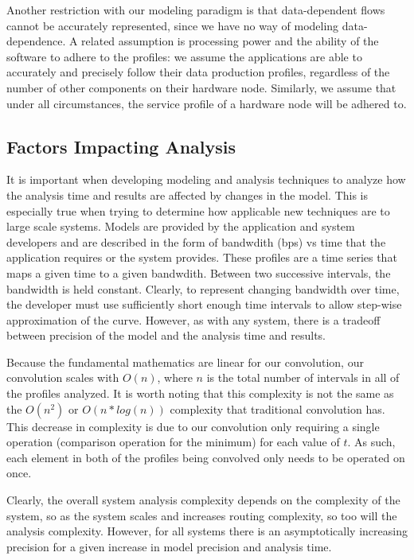Another restriction with our modeling paradigm is that data-dependent
flows cannot be accurately represented, since we have no way of
modeling data-dependence.  A related assumption is processing power
and the ability of the software to adhere to the profiles: we assume
the applications are able to accurately and precisely follow their
data production profiles, regardless of the number of other components
on their hardware node.  Similarly, we assume that under all
circumstances, the service profile of a hardware node will be adhered
to.

\subsection{Factors Impacting Analysis}
\label{subsec:impacts}

It is important when developing modeling and analysis techniques to
analyze how the analysis time and results are affected by changes in
the model.  This is especially true when trying to determine how
applicable new techniques are to large scale systems.  Models are
provided by the application and system developers and are described in
the form of bandwdith (bps) vs time that the application requires or
the system provides.  These profiles are a time series that maps a
given time to a given bandwdith.  Between two successive intervals,
the bandwidth is held constant.  Clearly, to represent changing
bandwidth over time, the developer must use sufficiently short enough
time intervals to allow step-wise approximation of the curve.
However, as with any system, there is a tradeoff between precision of
the model and the analysis time and results.

Because the fundamental mathematics are linear for our convolution,
our convolution scales with $O(n)$, where $n$ is the total
number of intervals in all of the profiles analyzed.  It is worth
noting that this complexity is not the same as the $O(n^2)$ or
$O(n*log(n))$ complexity that traditional convolution has.  This
decrease in complexity is due to our convolution only requiring a
single operation (comparison operation for the minimum) for each value
of $t$.  As such, each element in both of the profiles being
convolved only needs to be operated on once.

Clearly, the overall system analysis complexity depends on the
complexity of the system, so as the system scales and increases
routing complexity, so too will the analysis complexity.  However, for
all systems there is an asymptotically increasing precision for a
given increase in model precision and analysis time.

